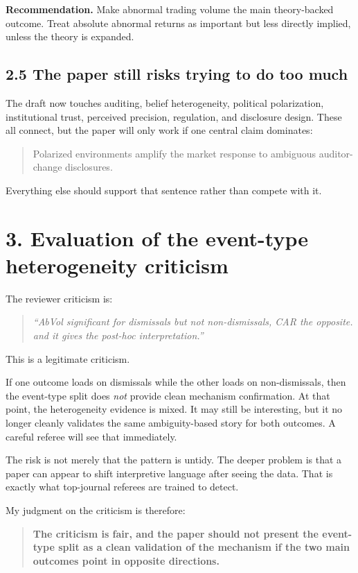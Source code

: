 \documentclass[11pt]{article}
\begin{document}
\textbf{Recommendation.} Make abnormal trading volume the main theory-backed outcome. Treat absolute abnormal returns as important but less directly implied, unless the theory is expanded.

\subsection*{2.5 The paper still risks trying to do too much}

The draft now touches auditing, belief heterogeneity, political polarization, institutional trust, perceived precision, regulation, and disclosure design. These all connect, but the paper will only work if one central claim dominates:

\begin{quote}
Polarized environments amplify the market response to ambiguous auditor-change disclosures.
\end{quote}

Everything else should support that sentence rather than compete with it.

\section*{3. Evaluation of the event-type heterogeneity criticism}

The reviewer criticism is:

\begin{quote}
\emph{``AbVol significant for dismissals but not non-dismissals, CAR the opposite. and it gives the post-hoc interpretation.''}
\end{quote}

This is a legitimate criticism.

If one outcome loads on dismissals while the other loads on non-dismissals, then the event-type split does \emph{not} provide clean mechanism confirmation. At that point, the heterogeneity evidence is mixed. It may still be interesting, but it no longer cleanly validates the same ambiguity-based story for both outcomes. A careful referee will see that immediately.

The risk is not merely that the pattern is untidy. The deeper problem is that a paper can appear to shift interpretive language after seeing the data. That is exactly what top-journal referees are trained to detect.

My judgment on the criticism is therefore:

\begin{quote}
\textbf{The criticism is fair, and the paper should not present the event-type split as a clean validation of the mechanism if the two main outcomes point in opposite directions.}
\end{quote}
\end{document}

